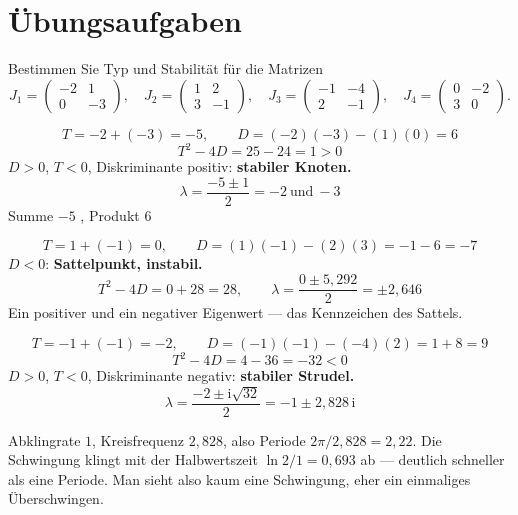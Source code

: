 \section{Übungsaufgaben}

\begin{aufgabe}
Bestimmen Sie Typ und Stabilität für die Matrizen
\[ J_1 = \begin{pmatrix} -2 & 1\\ 0 & -3\end{pmatrix},\quad
J_2 = \begin{pmatrix} 1 & 2\\ 3 & -1\end{pmatrix},\quad
J_3 = \begin{pmatrix} -1 & -4\\ 2 & -1\end{pmatrix},\quad
J_4 = \begin{pmatrix} 0 & -2\\ 3 & 0\end{pmatrix} . \]

\loesung
{}
\[ T = -2 + (-3) = -5, \qquad D = (-2)(-3) - (1)(0) = 6 \]
\[ T^2-4D = 25 - 24 = 1 > 0 \]
$D>0$, $T<0$, Diskriminante positiv: \textbf{stabiler Knoten.}
\[ \lambda = \frac{-5 \pm 1}{2} = -2 \ \text{und}\ -3 \]
 Summe $-5$ \checkmark, Produkt $6$ \checkmark

\[ T = 1 + (-1) = 0, \qquad D = (1)(-1) - (2)(3) = -1 - 6 = -7 \]
$D < 0$: \textbf{Sattelpunkt, instabil.}
\[ T^2-4D = 0 + 28 = 28, \qquad \lambda = \frac{0 \pm 5{,}292}{2} = \pm2{,}646 \]
Ein positiver und ein negativer Eigenwert --- das Kennzeichen des Sattels.

\begin{center}
\begin{minipage}{0.86\textwidth}
\end{minipage}
\end{center}

\[ T = -1 + (-1) = -2, \qquad D = (-1)(-1) - (-4)(2) = 1 + 8 = 9 \]
\[ T^2-4D = 4 - 36 = -32 < 0 \]
$D>0$, $T<0$, Diskriminante negativ: \textbf{stabiler Strudel.}
\[ \lambda = \frac{-2 \pm \mathrm{i}\sqrt{32}}{2} = -1 \pm 2{,}828\,\mathrm{i} \]

 Abklingrate $1$, Kreisfrequenz $2{,}828$, also Periode $2\pi/2{,}828 = 2{,}22$. Die Schwingung klingt mit der Halbwertszeit $\ln2/1 = 0{,}693$ ab --- deutlich schneller als eine Periode. Man sieht also kaum eine Schwingung, eher ein einmaliges Überschwingen.


\end{aufgabe}
